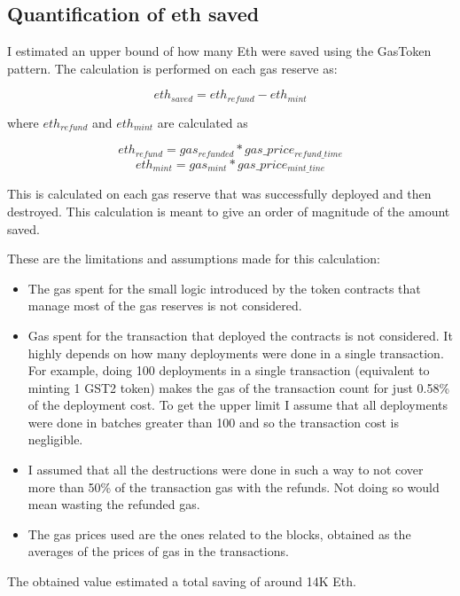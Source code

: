 \subsection{Quantification of eth saved}

I estimated an upper bound of how many Eth were saved using the GasToken pattern. The calculation is performed on each gas reserve as:

\[eth_{saved}=eth_{refund}-eth_{mint}\]

\noindent where $eth_{refund}$ and $eth_{mint}$ are calculated as

\[eth_{refund} = gas_{refunded}*gas\_price_{refund\_ time}\]
\[eth_{mint}=gas_{mint}*gas\_price_{mint\_tine}\]

This is calculated on each gas reserve that was successfully deployed and then destroyed. This calculation is meant to give an order of magnitude of the amount saved.

These are the limitations and assumptions made for this calculation:

\begin{itemize}

    \item The gas spent for the small logic introduced by the token contracts that manage most of the gas reserves is not considered.
    
    \item Gas spent for the transaction that deployed the contracts is not considered. It highly depends on how many deployments were done in a single transaction. For example, doing 100 deployments in a single transaction (equivalent to minting 1 GST2 token) makes the gas of the transaction count for just 0.58\% of the deployment cost. To get the upper limit I assume that all deployments were done in batches greater than 100 and so the transaction cost is negligible.

    \item I assumed that all the destructions were done in such a way to not cover more than 50\% of the transaction gas with the refunds. Not doing so would mean wasting the refunded gas. 

    \item The gas prices used are the ones related to the blocks, obtained as the averages of the prices of gas in the transactions.
    
\end{itemize}

The obtained value estimated a total saving of around 14K Eth.

